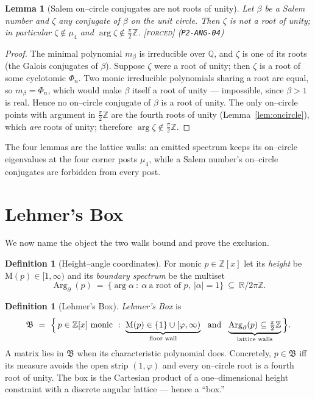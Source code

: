 \documentclass[11pt]{article}
\theoremstyle{plain}
\newtheorem{lemma}[theorem]{Lemma}
\theoremstyle{definition}
\newtheorem{definition}[theorem]{Definition}
\theoremstyle{remark}
\newcommand{\forced}{\textcolor{forcedc}{\textsc{[forced]}}}
\newcommand{\R}{\mathbb{R}}
\newcommand{\Q}{\mathbb{Q}}
\newcommand{\Z}{\mathbb{Z}}
\newcommand{\Mah}{\mathrm{M}}
\newcommand{\argc}{\operatorname{Arg}_{\partial}}
\newcommand{\abs}[1]{\left\lvert #1 \right\rvert}
\renewcommand{\Box}{\mathfrak{B}}
\begin{document}
\begin{lemma}[Salem on--circle conjugates are not roots of unity]\label{lem:salemirr}
Let $\beta$ be a Salem number and $\zeta$ any conjugate of $\beta$ on the unit circle. Then $\zeta$ is \emph{not} a root of unity; in particular $\zeta\notin\mu_4$ and $\arg\zeta\notin\tfrac\pi2\Z$. \forced{} {\small(\texttt{P2-ANG-04})}
\end{lemma}
\begin{proof}
The minimal polynomial $m_\beta$ is irreducible over $\Q$, and $\zeta$ is one of its roots (the Galois conjugates of $\beta$). Suppose $\zeta$ were a root of unity; then $\zeta$ is a root of some cyclotomic $\Phi_n$. Two monic irreducible polynomials sharing a root are equal, so $m_\beta=\Phi_n$, which would make $\beta$ itself a root of unity --- impossible, since $\beta>1$ is real. Hence no on--circle conjugate of $\beta$ is a root of unity. The only on--circle points with argument in $\tfrac\pi2\Z$ are the fourth roots of unity (Lemma~\ref{lem:oncircle}), which \emph{are} roots of unity; therefore $\arg\zeta\notin\tfrac\pi2\Z$.
\end{proof}

The four lemmas are the lattice walls: an emitted spectrum keeps its on--circle eigenvalues at the four corner posts $\mu_4$, while a Salem number's on--circle conjugates are forbidden from every post.

\section{Lehmer's Box}\label{sec:box}

We now name the object the two walls bound and prove the exclusion.

\begin{definition}[Height--angle coordinates]\label{def:coords}
For monic $p\in\Z[x]$ let its \emph{height} be $\Mah(p)\in[1,\infty)$ and its \emph{boundary spectrum} be the multiset
\[
\argc(p)\ =\ \bigl\{\arg\alpha\ :\ \alpha\ \text{a root of }p,\ \abs\alpha=1\bigr\}\ \subseteq\ \R/2\pi\Z .
\]
\end{definition}

\begin{definition}[Lehmer's Box]\label{def:box}
\emph{Lehmer's Box} is
\begin{equation}\label{eq:box}
\Box\ =\ \Bigl\{\,p\in\Z[x]\ \text{monic}\ :\ \underbrace{\Mah(p)\in\{1\}\cup[\varphi,\infty)}_{\text{floor wall}}\ \ \text{and}\ \ \underbrace{\argc(p)\subseteq\tfrac\pi2\Z}_{\text{lattice walls}}\,\Bigr\}.
\end{equation}
A matrix lies in $\Box$ when its characteristic polynomial does. Concretely, $p\in\Box$ iff its measure avoids the open strip $(1,\varphi)$ and every on--circle root is a fourth root of unity. The box is the Cartesian product of a one--dimensional height constraint with a discrete angular lattice --- hence a ``box.''
\end{definition}
\end{document}
